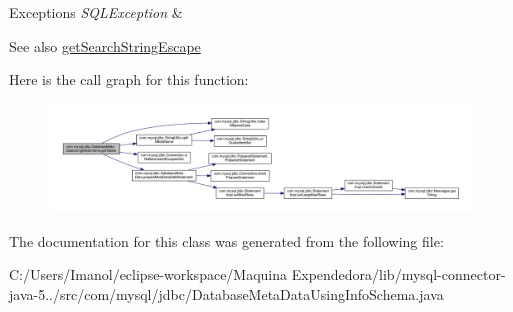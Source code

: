 \begin{DoxyExceptions}{Exceptions}
{\em S\+Q\+L\+Exception} & \\
\hline
\end{DoxyExceptions}
\begin{DoxySeeAlso}{See also}
\mbox{\hyperlink{classcom_1_1mysql_1_1jdbc_1_1_database_meta_data_a210b7942557a965c3af550074bb6fe9d}{get\+Search\+String\+Escape}} 
\end{DoxySeeAlso}
Here is the call graph for this function\+:
\nopagebreak
\begin{figure}[H]
\begin{center}
\leavevmode
\includegraphics[width=350pt]{classcom_1_1mysql_1_1jdbc_1_1_database_meta_data_using_info_schema_a77e696e0c2b875ddbf17513a1be3f6a3_cgraph}
\end{center}
\end{figure}


The documentation for this class was generated from the following file\+:\begin{DoxyCompactItemize}
\item 
C\+:/\+Users/\+Imanol/eclipse-\/workspace/\+Maquina Expendedora/lib/mysql-\/connector-\/java-\/5../src/com/mysql/jdbc/Database\+Meta\+Data\+Using\+Info\+Schema.\+java\end{DoxyCompactItemize}
